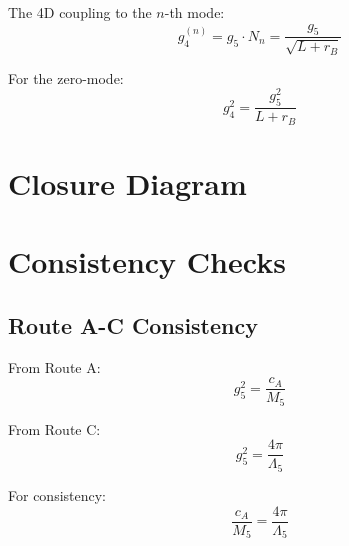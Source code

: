 \documentclass[11pt,a4paper]{article}
\begin{document}
The 4D coupling to the $n$-th mode:
\begin{equation}
\label{eq:bkt-g4n}
g_4^{(n)} = g_5 \cdot N_n = \frac{g_5}{\sqrt{L + r_B}}
\end{equation}

For the zero-mode:
\begin{equation}
\label{eq:bkt-g4-zero}
g_4^2 = \frac{g_5^2}{L + r_B}
\end{equation}

\section{Closure Diagram}
\label{app:closure-diagram}

\begin{center}
\end{center}

\section{Consistency Checks}
\label{app:consistency}

\subsection{Route A-C Consistency}
\label{app:ac-consistency}

From Route A:
\begin{equation}
\label{eq:ac-route-a}
g_5^2 = \frac{c_A}{M_5}
\end{equation}

From Route C:
\begin{equation}
\label{eq:ac-route-c}
g_5^2 = \frac{4\pi}{\Lambda_5}
\end{equation}

For consistency:
\begin{equation}
\label{eq:ac-consistency}
\frac{c_A}{M_5} = \frac{4\pi}{\Lambda_5}
\end{equation}
\end{document}
